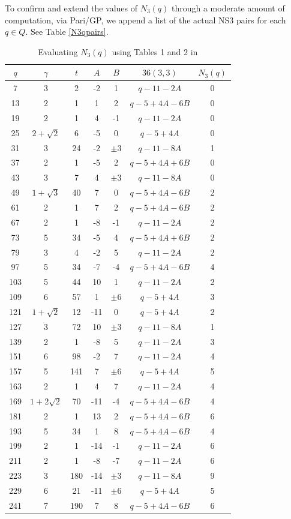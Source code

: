 \documentclass[12pt]{amsart}
\numberwithin{equation}{section}
\begin{document}
\bigskip
To confirm and extend the values of $N_3(q)$ through a moderate amount of computation, via Pari/GP, we  append a list of the actual NS3 pairs for each $q \in Q$.    See Table \ref{N3qpairs}.

\begin{table}[H]
\centering
\renewcommand{\arraystretch}{1.15}
\caption{Evaluating $N_3(q)$ using Tables 1 and 2 in \cite{AK1995}}
\label{N3qvalues}
\begin{tabular}{ccccccc}
\toprule
$q$ & $\gamma$ & $t$ & $A$ & $B$ & $36(3,3)$ & $N_3(q)$ \\ 
\midrule
7   & 3 & 2 & -2 & 1& $q-11-2A$ & 0 \\
13  & 2 & 1 & 1 & 2 & $q-5+4A-6B$ & 0 \\
19  & 2 & 1 & 4 & -1 & $q-11-2A$ & 0 \\
25  & $2+\sqrt{2}$ & 6 & -5 & 0 & $q-5+4A$ & 0  \\
31  & 3 & 24 & -2 & $\pm 3$ & $q-11-8A$ & 1 \\
37  & 2 & 1 & -5 & 2 & $q-5+4A+6B$ & 0 \\
43  & 3 & 7 & 4 & $\pm 3$ & $q-11-8A$ & 0 \\
49  & $1+\sqrt{3}$ & 40 & 7 & 0 & $q-5+4A-6B$ & 2 \\
61  & 2 & 1 & 7 & 2 & $q-5+4A-6B$ & 2 \\
67  & 2 & 1 & -8 & -1 & $q-11-2A$ & 2 \\
73  & 5 & 34 & -5 & 4 & $q-5+4A+6B$ & 2 \\
79  & 3 & 4 & -2 & 5 & $q-11-2A$ & 2 \\
97  & 5 & 34 & -7 & -4 & $q-5+4A-6B$ & 4 \\
103 & 5 & 44 & 10 & 1 & $q-11-2A$ & 2 \\
109 & 6 & 57 & 1 & $\pm 6$ & $q-5+4A$ & 3 \\
121 & $1+\sqrt{2}$ & 12 & -11 & 0 & $q-5+4A$ & 2 \\
127 & 3 & 72 & 10 & $\pm 3$ & $q-11-8A$ & 1 \\
139 & 2 & 1 & -8 & 5 & $q-11-2A$ & 3 \\
151 & 6 & 98 & -2 & 7 & $q-11-2A$ & 4 \\
157 & 5 & 141 & 7 & $\pm 6$ & $q-5+4A$ & 5 \\
163 & 2 & 1 & 4 & 7 & $q-11-2A$ & 4 \\
169 & $1+2\sqrt{2}$ & 70 & -11 & -4 & $q-5+4A-6B$ & 4 \\
181 & 2 & 1 & 13 & 2 & $q-5+4A-6B$ & 6 \\
193 & 5 & 34 & 1 & 8 & $q-5+4A-6B$ & 4 \\
199 & 2 & 1 & -14 & -1 & $q-11-2A$ & 6 \\
211 & 2 & 1 & -8 & -7 & $q-11-2A$ & 6 \\
223 & 3 & 180 & -14 & $\pm 3$ & $q-11-8A$ & 9 \\
229 & 6 & 21 & -11 & $\pm 6$ & $q-5+4A$ & 5 \\
241 & 7 & 190 & 7 & 8 & $q-5+4A-6B$ & 6 \\
\bottomrule
\end{tabular}
\end{table}
\end{document}
